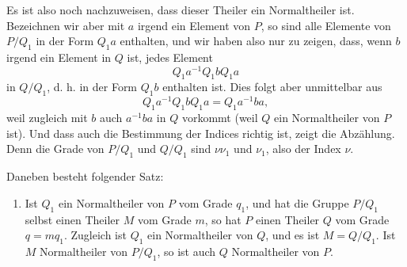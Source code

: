\documentclass[11pt]{article}
\begin{document}
Es ist also noch nachzuweisen, dass dieser Theiler ein Normaltheiler ist. Bezeichnen wir aber mit $a$ irgend ein Element von $P$, so sind alle Elemente von $P/Q_1$ in der Form $Q_1a$ enthalten, und wir haben also nur zu zeigen, dass, wenn $b$ irgend ein Element in $Q$ ist, jedes Element
\begin{equation}
Q_1a^{-1}Q_1bQ_1a
\tag{6}
\end{equation}
in $Q/Q_1$, d. h. in der Form $Q_1b$ enthalten ist. Dies folgt aber unmittelbar aus
\begin{equation}
Q_1a^{-1}Q_1bQ_1a=Q_1a^{-1}ba,
\tag{7}
\end{equation}
weil zugleich mit $b$ auch $a^{-1}ba$ in $Q$ vorkommt (weil $Q$ ein Normaltheiler von $P$ ist). Und dass auch die Bestimmung der Indices richtig ist, zeigt die Abzählung. Denn die Grade von $P/Q_1$ und $Q/Q_1$ sind $\nu\nu_1$ und $\nu_1$, also der Index $\nu$.

Daneben besteht folgender Satz:
\begin{enumerate}[resume,label=\arabic*.]
\item Ist $Q_1$ ein Normaltheiler von $P$ vom Grade $q_1$, und hat die Gruppe $P/Q_1$ selbst einen Theiler $M$ vom Grade $m$, so hat $P$ einen Theiler $Q$ vom Grade $q=mq_1$. Zugleich ist $Q_1$ ein Normaltheiler von $Q$, und es ist $M=Q/Q_1$. Ist $M$ Normaltheiler von $P/Q_1$, so ist auch $Q$ Normaltheiler von $P$.
\end{enumerate}
\end{document}
